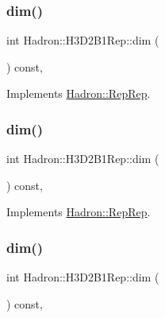 \subsubsection{\texorpdfstring{dim()}{dim()}\hspace{0.1cm}{\footnotesize\ttfamily [3/5]}}
{\footnotesize\ttfamily int Hadron\+::\+H3\+D2\+B1\+Rep\+::dim (\begin{DoxyParamCaption}{ }\end{DoxyParamCaption}) const\hspace{0.3cm}{\ttfamily [inline]}, {\ttfamily [virtual]}}



Implements \mbox{\hyperlink{structHadron_1_1RepRep_a92c8802e5ed7afd7da43ccfd5b7cd92b}{Hadron\+::\+Rep\+Rep}}.

\mbox{\label{structHadron_1_1H3D2B1Rep_a6330bd40d22d4580286ffabbcf9f3c7d}} 
\subsubsection{\texorpdfstring{dim()}{dim()}\hspace{0.1cm}{\footnotesize\ttfamily [4/5]}}
{\footnotesize\ttfamily int Hadron\+::\+H3\+D2\+B1\+Rep\+::dim (\begin{DoxyParamCaption}{ }\end{DoxyParamCaption}) const\hspace{0.3cm}{\ttfamily [inline]}, {\ttfamily [virtual]}}



Implements \mbox{\hyperlink{structHadron_1_1RepRep_a92c8802e5ed7afd7da43ccfd5b7cd92b}{Hadron\+::\+Rep\+Rep}}.

\mbox{\label{structHadron_1_1H3D2B1Rep_a6330bd40d22d4580286ffabbcf9f3c7d}} 
\subsubsection{\texorpdfstring{dim()}{dim()}\hspace{0.1cm}{\footnotesize\ttfamily [5/5]}}
{\footnotesize\ttfamily int Hadron\+::\+H3\+D2\+B1\+Rep\+::dim (\begin{DoxyParamCaption}{ }\end{DoxyParamCaption}) const\hspace{0.3cm}{\ttfamily [inline]}, {\ttfamily [virtual]}}



